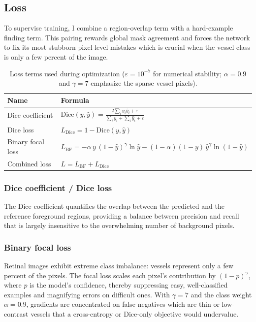 \documentclass[11pt]{article}
\begin{document}
\subsection{Loss}
\label{sec:Loss}
To supervise training, I combine a region-overlap term with a hard-example finding term. This pairing rewards global mask agreement and forces the network to fix its most stubborn pixel-level mistakes which is crucial when the vessel class is only a few percent of the image.

\begin{table}[h!]
\centering
\renewcommand{\arraystretch}{1.2}
\begin{tabular}{@{}l l@{}}
\toprule
\textbf{Name} & \textbf{Formula} \\ \midrule
Dice coefficient  &
$\displaystyle
\mathrm{Dice}(y,\hat y)=
\frac{2\sum_i y_i\hat y_i+\varepsilon}
     {\sum_i y_i+\sum_i\hat y_i+\varepsilon}$ \\[4pt]

Dice loss         &
$L_{\mathrm{Dice}} = 1-\mathrm{Dice}(y,\hat y)$ \\[4pt]

Binary focal loss &
$L_{\mathrm{BF}} =
-\alpha\,y\,(1-\hat y)^{\gamma}\ln\hat y
-(1-\alpha)(1-y)\,\hat y^{\gamma}\ln(1-\hat y)$ \\[4pt]

Combined loss     &
$L = L_{\mathrm{BF}} + L_{\mathrm{Dice}}$ \\ \bottomrule
\end{tabular}
\caption{Loss terms used during optimization ($\varepsilon\!=\!10^{-7}$ for numerical stability;
$\alpha\!=\!0.9$ and $\gamma\!=\!7$ emphasize the sparse vessel pixels).}
\end{table}

\subsubsection{Dice coefficient / Dice loss}
\label{sec:Dice}
The Dice coefficient quantifies the overlap between the predicted and the reference foreground regions, providing a balance between precision and recall that is largely insensitive to the overwhelming number of background pixels.

\subsubsection{Binary focal loss}
\label{sec:BFLoss}
Retinal images exhibit extreme class imbalance: vessels represent only a few percent of the pixels. The focal loss scales each pixel’s contribution by $(1-p)^{\gamma}$, where $p$ is the model’s confidence, thereby suppressing easy, well-classified examples and magnifying errors on difficult ones. With $\gamma=7$ and the class weight $\alpha=0.9$, gradients are concentrated on false negatives which are thin or low-contrast vessels that a cross-entropy or Dice-only objective would undervalue.
\end{document}
